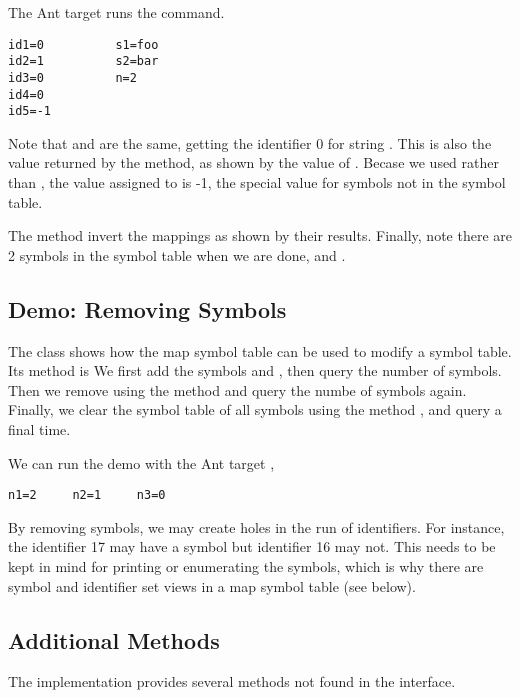 The Ant target  runs the command.
%
\begin{verbatim}
id1=0          s1=foo
id2=1          s2=bar
id3=0          n=2
id4=0
id5=-1
\end{verbatim}
%
Note that  and  are the same, getting the
identifier 0 for string .  This is also the value returned
by the  method, as shown by the value of
.  Becase we used  rather than
, the value assigned to  is -1,
the special value for symbols not in the symbol table.  

The  method invert the mappings as shown by their
results.  Finally, note there are 2 symbols in the symbol table when
we are done,  and .


\subsection{Demo: Removing Symbols}

The class  shows how the map symbol table
can be used to modify a symbol table.  Its  method is
%
%
We first add the symbols  and , then query the
number of symbols.  Then we remove  using the method
 and query the numbe of symbols again.  Finally,
we clear the symbol table of all symbols using the method ,
and query a final time.  

We can run the demo with the Ant target ,
%
\begin{verbatim}
n1=2     n2=1     n3=0
\end{verbatim}

By removing symbols, we may create holes in the run of identifiers.
For instance, the identifier 17 may have a symbol but identifier 16
may not.  This needs to be kept in mind for printing or enumerating
the symbols, which is why there are symbol and identifier set views
in a map symbol table (see below).

\subsection{Additional  Methods}

The implementation  provides several methods not
found in the  interface.  


